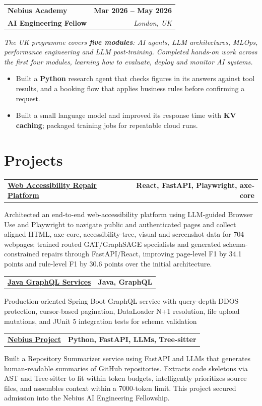 \documentclass[letterpaper,10pt]{article}
\makeatletter
\newcommand{\resumeRole}[4]{%
  \noindent\begin{tabular*}{\textwidth}{@{}l@{\extracolsep{\fill}}r@{}}
    \textbf{#1} & \textbf{#2}\\[1pt]
    \textbf{#3} & \textit{#4}\\[3pt]
  \end{tabular*}\vspace{-2pt}
}
\newcommand{\resumeProject}[3]{%
  \noindent\begin{tabular*}{\textwidth}{@{}l@{\extracolsep{\fill}}r@{}}
    \textbf{\href{#2}{#1}} & \textbf{\small #3}
  \end{tabular*}\vspace{-2pt}
}
\newenvironment{resumeBullets}{%
  \begin{itemize}[leftmargin=0.19in,label=\textbullet,itemsep=0.2pt,topsep=0.8pt,parsep=0pt,partopsep=0pt]
}{%
  \end{itemize}\vspace{1pt}
}
\newcommand{\resumeContext}[1]{\noindent\textit{#1}\par\vspace{1pt}}
\makeatother
\begin{document}
\resumeRole{Nebius Academy}{Mar 2026 -- May 2026}{AI Engineering Fellow}{London, UK}
\resumeContext{The UK programme covers \textbf{five modules}: AI agents, LLM architectures, MLOps, performance engineering and LLM post-training. Completed hands-on work across the first four modules, learning how to evaluate, deploy and monitor AI systems.}
\begin{resumeBullets}
  \item Built a \textbf{Python} research agent that checks figures in its answers against tool results, and a booking flow that applies business rules before confirming a request.
  \item Built a small language model and improved its response time with \textbf{KV caching}; packaged training jobs for repeatable cloud runs.
\end{resumeBullets}



\section{Projects}
\resumeProject{Web Accessibility Repair Platform}{https://github.com/aymanapatel/rl-a11y}{React, FastAPI, Playwright, axe-core}
Architected an end-to-end web-accessibility platform using LLM-guided Browser Use and Playwright to navigate public and authenticated pages and collect aligned HTML, axe-core, accessibility-tree, visual and screenshot data for 704 webpages; trained routed GAT/GraphSAGE specialists and generated schema-constrained repairs through FastAPI/React, improving page-level F1 by 34.1 points and rule-level F1 by 30.6 points over the initial architecture.\par\vspace{2pt}

\resumeProject{Java GraphQL Services}{https://github.com/aymanapatel/graphql-app}{Java, GraphQL}Production-oriented Spring Boot GraphQL service with query-depth DDOS protection, cursor-based pagination, DataLoader N+1 resolution, file upload mutations, and JUnit 5 integration tests for schema validation

\resumeProject{Nebius Project}{https://github.com/aymanapatel/nebius-project}{Python, FastAPI, LLMs, Tree-sitter}
Built a Repository Summarizer service using FastAPI and LLMs that generates human-readable summaries of GitHub repositories. Extracts code skeletons via AST and Tree-sitter to fit within token budgets, intelligently prioritizes source files, and assembles context within a 7000-token limit. This project secured admission into the Nebius AI Engineering Fellowship.\par\vspace{2pt}
\end{document}
